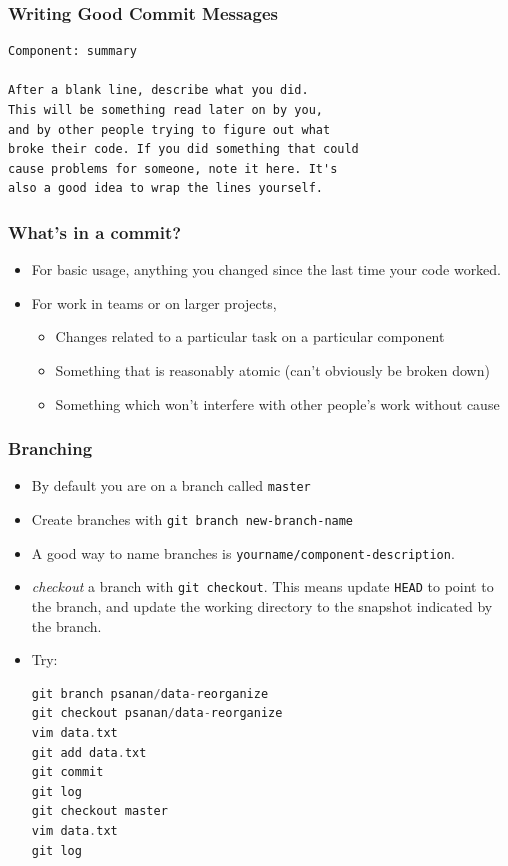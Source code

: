 \documentclass{beamer}
\begin{document}
\begin{frame}[fragile]
\frametitle{Writing Good Commit Messages}
\begin{verbatim}
Component: summary

After a blank line, describe what you did. 
This will be something read later on by you,
and by other people trying to figure out what
broke their code. If you did something that could 
cause problems for someone, note it here. It's
also a good idea to wrap the lines yourself.
\end{verbatim}
\end{frame}

\begin{frame}[fragile]
\frametitle{What's in a commit?}
\begin{itemize}
\item For basic usage, anything you changed since the last time your code worked.
\item For work in teams or on larger projects,
\begin{itemize}
\item Changes related to a particular task on a particular component
\item Something that is reasonably atomic (can't obviously be broken down)
\item Something which won't interfere with other people's work without cause
\end{itemize}
\end{itemize}
\end{frame}

\begin{frame}[fragile]
\frametitle{Branching}
\begin{itemize}
\item By default you are on a branch called \texttt{master}
\item Create branches with \lstinline{git branch new-branch-name}
\item A good way to name branches is \lstinline{yourname/component-description}.
\item \emph{checkout} a branch with \lstinline{git checkout}. This means update \texttt{HEAD} to point to the branch, and update the working directory to the snapshot indicated by the branch.
\item Try:
\begin{lstlisting}[language=C++]
git branch psanan/data-reorganize
git checkout psanan/data-reorganize
vim data.txt
git add data.txt
git commit
git log
git checkout master
vim data.txt
git log
\end{lstlisting}
\end{itemize}
\end{frame}
\end{document}
